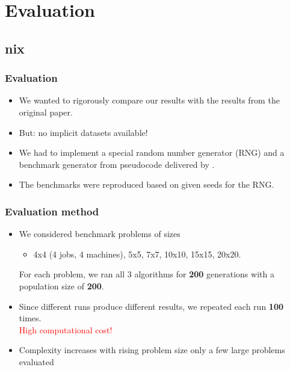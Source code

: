 \section{Evaluation}

\subsection{nix}
\begin{frame}
  \frametitle{Evaluation}
\begin{itemize}

	\item We wanted to rigorously compare our results with the results from the original paper.
	\item But: no implicit datasets available!

	\item We had to implement a special random number generator (RNG) and a benchmark generator from pseudocode delivered by \cite[Taillard'03]{Benchmarks}.

	\item The benchmarks were reproduced based on given seeds for the RNG.
\end{itemize}

\end{frame}


\begin{frame}
	\frametitle{Evaluation method}
\begin{itemize}

	\item We considered benchmark problems of sizes
		\begin{itemize}
		
			\item 4x4 (4 jobs, 4 machines), 5x5, 7x7, 10x10, 15x15, 20x20. 
		\end{itemize}
		
	For each problem, we  ran all 3 algorithms for \textbf{200} generations with a population size of \textbf{200}.

	\item 	Since different runs produce different results, we repeated each run \textbf{100} times. 
	\\ 		\textcolor{red}{\textrightarrow		High computational cost!}

	\item 	Complexity increases with rising problem size \textrightarrow	only a few large problems evaluated 
\end{itemize}

	
\end{frame}

